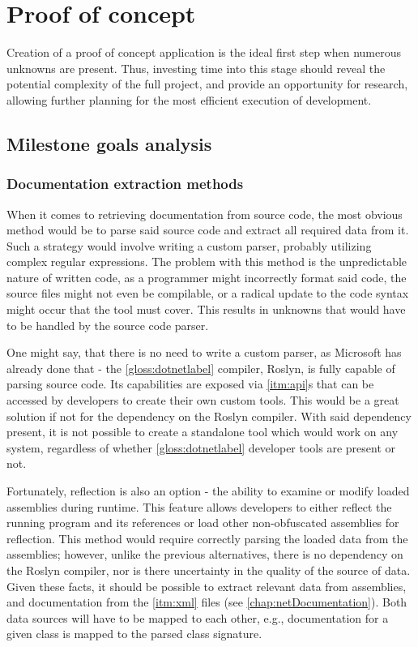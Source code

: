 \chapter{Proof of concept} \label{chap:proofConcept}

Creation of a proof of concept application is the ideal first step when numerous unknowns are present. Thus, investing time into this stage should reveal the potential complexity of the full project, and provide an opportunity for research, allowing further planning for the most efficient execution of development.

\section{Milestone goals analysis}

\subsection{Documentation extraction methods}
When it comes to retrieving documentation from source code, the most obvious method would be to parse said source code and extract all required data from it. Such a strategy would involve writing a custom parser, probably utilizing complex regular expressions. The problem with this method is the unpredictable nature of written code, as a programmer might incorrectly format said code, the source files might not even be compilable, or a radical update to the code syntax might occur that the tool must cover. This results in unknowns that would have to be handled by the source code parser.

One might say, that there is no need to write a custom parser, as Microsoft has already done that - the \ref{gloss:dotnetlabel} compiler, Roslyn, is fully capable of parsing source code. Its capabilities are exposed via \ref{itm:api}s that can be accessed by developers to create their own custom tools. This would be a great solution if not for the dependency on the Roslyn compiler. With said dependency present, it is not possible to create a standalone tool which would work on any system, regardless of whether \ref{gloss:dotnetlabel} developer tools are present or not.

Fortunately, reflection is also an option - the ability to examine or modify loaded assemblies during runtime. This feature allows developers to either reflect the running program and its references or load other non-obfuscated assemblies for reflection. This method would require correctly parsing the loaded data from the assemblies; however, unlike the previous alternatives, there is no dependency on the Roslyn compiler, nor is there uncertainty in the quality of the source of data. Given these facts, it should be possible to extract relevant data from assemblies, and documentation from the \ref{itm:xml} files (see \ref{chap:netDocumentation}). Both data sources will have to be mapped to each other, e.g., documentation for a given class is mapped to the parsed class signature.


